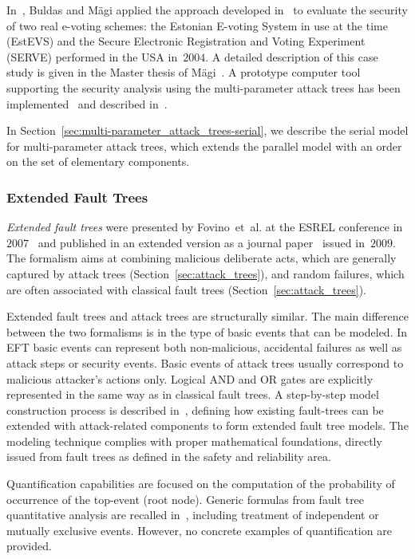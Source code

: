 \documentclass[a4paper]{article}
\begin{document}
In~\cite{BuTr}, Buldas and M\"{a}gi applied the approach developed
in~\cite{BuLaPrSaWi} to evaluate the security of two real e-voting schemes: the
Estonian E-voting System in use at the time (EstEVS) and the Secure Electronic
Registration and Voting Experiment (SERVE) performed in the USA in~$2004$. A
detailed description of this case study is given in the Master thesis of
M\"{a}gi~\cite{Magi}. A prototype computer tool supporting the security analysis
using the multi-parameter attack trees has been implemented~\cite{Program4} and
described in~\cite{AndrusenkoMaster}. 

In Section~\ref{sec:multi-parameter_attack_trees-serial}, we describe
the serial model for multi-parameter attack trees,
which extends the parallel model with an order on the set of elementary
components.

\subsubsection{Extended Fault Trees} 
\label{sec:extended_fault_trees}

\emph{Extended fault trees} were presented by Fovino~et~al. at the ESREL
conference in~$2007$~\cite{MaFoCi} and published in an extended version as a
journal paper~\cite{FoMaCi} issued in~$2009$. The formalism aims at combining
malicious deliberate acts, which are generally captured by attack trees
(Section~\ref{sec:attack_trees}), and random failures, which are often
associated with classical fault trees (Section~\ref{sec:attack_trees}).

Extended fault trees and attack trees are structurally similar. The main
difference between the two formalisms is in the type of basic events  that can
be modeled. In EFT basic events can represent both non-malicious, accidental
failures  as well as attack steps or security events. Basic events of attack
trees usually correspond to malicious attacker's actions only. Logical AND and
OR gates are explicitly represented in the same way as in classical fault trees.
A step-by-step model construction process is described in~\cite{FoMaCi},
defining how existing fault-trees can be extended with attack-related components
to form extended fault tree models. The modeling technique complies with proper
mathematical foundations,  directly issued from fault trees as defined in the
safety and reliability area.

Quantification capabilities are focused on the computation of the probability
of occurrence of the top-event (root node). Generic formulas from fault tree
quantitative analysis are recalled in~\cite{FoMaCi}, including treatment of 
independent or mutually exclusive events. However, no concrete examples of 
quantification are provided.
\end{document}
